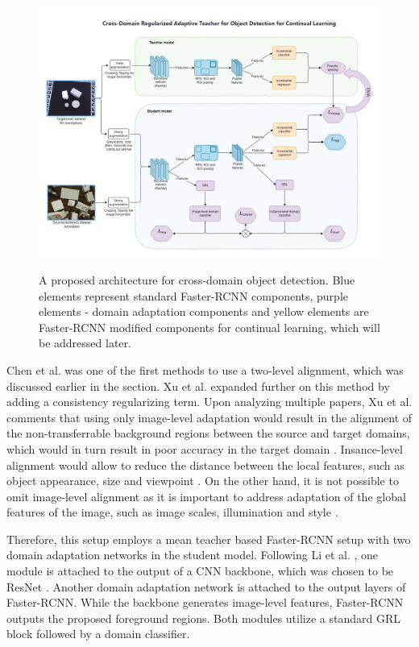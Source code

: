 \documentclass[english, 12pt, a4paper, elec, utf8, a-1b, online]{aaltothesis}
\begin{document}
\begin{figure}[htb]
	\begin{center}
		\includegraphics[width=16cm]{./MyModel.png}
	\end{center}
	\caption{A proposed architecture for cross-domain object detection. Blue elements represent standard Faster-RCNN components, purple elements - domain adaptation components and yellow elements are Faster-RCNN modified components for continual learning, which will be addressed later.}
	\begin{center}
		\label{mymodel}
	\end{center}
\end{figure}
\FloatBarrier

Chen et al. \cite{Chen2018} was one of the first methods to use a two-level alignment, which was discussed earlier in the  section. Xu et al. \cite{Xu2020} expanded further on this method by adding a consistency regularizing term. Upon analyzing multiple papers, Xu et al. comments that using only image-level adaptation would result in the alignment of the non-transferrable background regions between the source and target domains, which would in turn result in poor accuracy in the target domain \cite{Xu2020}. Insance-level alignment would allow to reduce the distance between the local features, such as object appearance, size and viewpoint \cite{Chen2018}. On the other hand, it is not possible to omit image-level alignment as it is important to address adaptation of the global features of the image, such as image scales, illumination and style \cite{Chen2018}. 

Therefore, this setup employs a mean teacher based Faster-RCNN \cite{ima} setup with two domain adaptation networks in the student model. Following Li et al. \cite{Li2021}, one module is attached to the output of a CNN backbone, which was chosen to be ResNet \cite{He2015}. Another domain adaptation network is attached to the output layers of Faster-RCNN. While the backbone generates image-level features, Faster-RCNN outputs the proposed foreground regions. Both modules utilize a standard GRL block \cite{Ganin2015} followed by a domain classifier.
\end{document}
